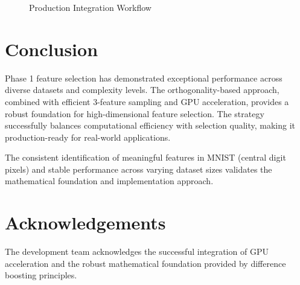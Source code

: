 \documentclass[11pt,a4paper]{article}
\begin{document}
\begin{figure}[h!]
\centering
{}
\caption{Production Integration Workflow}
\label{fig:workflow}
\end{figure}

\section{Conclusion}

Phase 1 feature selection has demonstrated exceptional performance across diverse datasets and complexity levels. The orthogonality-based approach, combined with efficient 3-feature sampling and GPU acceleration, provides a robust foundation for high-dimensional feature selection. The strategy successfully balances computational efficiency with selection quality, making it production-ready for real-world applications.

The consistent identification of meaningful features in MNIST (central digit pixels) and stable performance across varying dataset sizes validates the mathematical foundation and implementation approach.

\section*{Acknowledgements}
The development team acknowledges the successful integration of GPU acceleration and the robust mathematical foundation provided by difference boosting principles.
\end{document}
